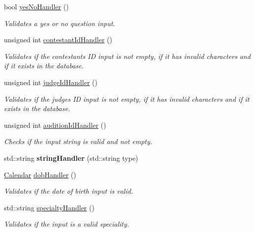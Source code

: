 \begin{DoxyCompactItemize}
bool \hyperlink{class_company_m_s_a60ab36821370917191ec31d3a220bc0a}{yes\+No\+Handler} ()
\begin{DoxyCompactList}\small\item\em Validates a yes or no question input. \end{DoxyCompactList}\item 
unsigned int \hyperlink{class_company_m_s_a084f27a52d2be6d54c82fccca6b1461f}{contestant\+Id\+Handler} ()
\begin{DoxyCompactList}\small\item\em Validates if the contestant\textquotesingle{}s ID input is not empty, if it has invalid characters and if it exists in the database. \end{DoxyCompactList}\item 
unsigned int \hyperlink{class_company_m_s_a6955c9821dccc668c367dedc5bc9515c}{judge\+Id\+Handler} ()
\begin{DoxyCompactList}\small\item\em Validates if the judge\textquotesingle{}s ID input is not empty, if it has invalid characters and if it exists in the database. \end{DoxyCompactList}\item 
unsigned int \hyperlink{class_company_m_s_a3cb95a890e85cb5e4b733033ae34d56a}{audition\+Id\+Handler} ()
\begin{DoxyCompactList}\small\item\em Checks if the input string is valid and not empty. \end{DoxyCompactList}\item 
\mbox{\label{class_company_m_s_ad73ecf286947e5894a53b5e205600a05}} 
std\+::string {\bfseries string\+Handler} (std\+::string type)
\item 
\hyperlink{class_calendar}{Calendar} \hyperlink{class_company_m_s_a0018f0d192b4450e3203a581490e87ae}{dob\+Handler} ()
\begin{DoxyCompactList}\small\item\em Validates if the date of birth input is valid. \end{DoxyCompactList}\item 
std\+::string \hyperlink{class_company_m_s_a82a491843b448c0e87b91b0ba858d916}{specialty\+Handler} ()
\begin{DoxyCompactList}\small\item\em Validates if the input is a valid speciality. \end{DoxyCompactList}\item 

\end{DoxyCompactItemize}
